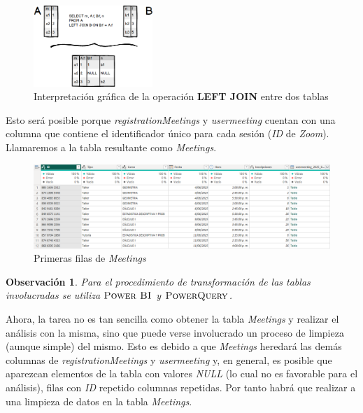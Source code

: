 \documentclass[11pt,a4paper]{book}
\newtheorem{observacion}[teorema]{Observaci\'on}
\theoremstyle{definition}%
\begin{document}
                \begin{figure}[H]
                    \centering
                    \includegraphics[width=0.4\textwidth]{Sources/SQL-left-join-example.png}
                    \caption{Interpretación gráfica de la operación \textbf{LEFT JOIN} entre dos tablas}
                    \label{fig:SQL-left-join-example}
                \end{figure}
                Esto será posible porque \textit{registrationMeetings} y \textit{usermeeting} cuentan con una columna que contiene el identificador único para cada sesión (\textit{ID} de \textit{Zoom}). Llamaremos a la tabla resultante como \textit{Meetings}.
                
                \begin{figure}[H]
                    \centering
                    \includegraphics[width=1\textwidth]{Sources/Meetings_Head.png}
                    \caption{Primeras filas de \textit{Meetings}}
                    \label{fig:meetings_head}
                \end{figure}
                \begin{observacion}
                    Para el procedimiento de transformación de las tablas involucradas se utiliza $\textup{\textsc{Power BI}}$ y $\textup{\textsc{PowerQuery}}$.
                \end{observacion}
                
                Ahora, la tarea no es tan sencilla como obtener la tabla \textit{Meetings} y realizar el análisis con la misma, sino que puede verse involucrado un proceso de limpieza (aunque simple) del mismo. Esto es debido a que \textit{Meetings} heredará las demás columnas de \textit{registrationMeetings} y \textit{usermeeting} y, en general, es posible que aparezcan elementos de la tabla con valores \textit{NULL} (lo cual no es favorable para el análisis), filas con \textit{ID} repetido columnas repetidas. Por tanto habrá que realizar a una limpieza de datos en la tabla \textit{Meetings}.
\end{document}
